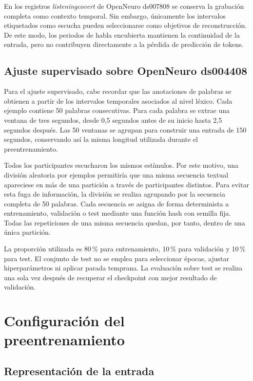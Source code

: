 En los registros \textit{listeningcovert} de OpenNeuro ds007808 se conserva la grabación completa como contexto temporal. Sin embargo, únicamente los intervalos etiquetados como escucha pueden seleccionarse como objetivos de reconstrucción. De este modo, los periodos de habla encubierta mantienen la continuidad de la entrada, pero no contribuyen directamente a la pérdida de predicción de tokens.

\subsection{Ajuste supervisado sobre OpenNeuro ds004408}

Para el ajuste supervisado, cabe recordar que las anotaciones de palabras se obtienen a partir de los intervalos temporales asociados al nivel léxico. Cada ejemplo contiene 50 palabras consecutivas. Para cada palabra se extrae una ventana de tres segundos, desde 0,5 segundos antes de su inicio hasta 2,5 segundos después. Las 50 ventanas se agrupan para construir una entrada de 150 segundos, conservando así la misma longitud utilizada durante el preentrenamiento.

Todos los participantes escucharon los mismos estímulos. Por este motivo, una división aleatoria por ejemplos permitiría que una misma secuencia textual apareciese en más de una partición a través de participantes distintos. Para evitar esta fuga de información, la división se realiza agrupando por la secuencia completa de 50 palabras. Cada secuencia se asigna de forma determinista a entrenamiento, validación o test mediante una función hash con semilla fija. Todas las repeticiones de una misma secuencia quedan, por tanto, dentro de una única partición.

La proporción utilizada es 80\,\% para entrenamiento, 10\,\% para validación y 10\,\% para test. El conjunto de test no se emplea para seleccionar épocas, ajustar hiperparámetros ni aplicar parada temprana. La evaluación sobre test se realiza una sola vez después de recuperar el checkpoint con mejor resultado de validación.

\section{Configuración del preentrenamiento}

\subsection{Representación de la entrada}

